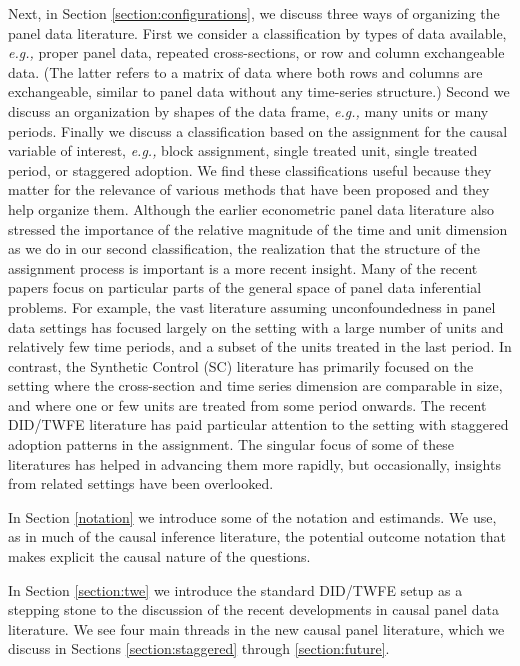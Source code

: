 \documentclass[letterpaper,12pt,leqno]{article}
\begin{document}
Next, in Section \ref{section:configurations}, we discuss three ways of organizing the panel data literature. First we consider a classification  by types of data available, {\it e.g.,} proper panel data, repeated cross-sections, or row and column exchangeable data.  (The latter  refers to a matrix of data where both rows and columns are exchangeable, similar to panel data without any time-series structure.) Second we discuss an organization by shapes of the data frame, {\it e.g.,} many units or many periods. Finally we discuss  a classification based on the assignment for the causal variable of interest, {\it e.g.,} block assignment, single treated unit, single treated period, or staggered adoption. We find these  classifications useful because they matter for the relevance of various methods that have been proposed and they help organize them. Although the earlier econometric panel data literature also stressed the importance of the relative magnitude of the time and unit dimension as we do in our second classification, the realization that the structure of the assignment process is important is a more recent insight.
Many of the recent papers focus on particular parts of the general space of panel data inferential problems. For example, the vast literature assuming unconfoundedness in panel data settings has focused largely on the setting with a large number of units and relatively few time periods, and a subset of the units treated in the last period. In contrast, the Synthetic Control (SC) literature has primarily focused on the setting where the cross-section and time series dimension are comparable in size, and where one or few units are treated from some period onwards. The recent DID/TWFE literature has paid particular attention to the setting with staggered adoption patterns in the assignment. The singular focus of some of these literatures has helped in advancing them more rapidly, but occasionally, insights from related settings have been overlooked.

In Section \ref{notation} we introduce some of the notation and estimands. We use, as in much of the causal inference literature, the potential outcome notation that makes explicit the causal nature of the questions. 


In Section \ref{section:twe} we introduce the standard DID/TWFE setup as a stepping stone to the discussion of the recent developments in causal panel data literature. We see four main threads in the new causal panel literature, which we discuss in Sections \ref{section:staggered} through \ref{section:future}.
\end{document}
